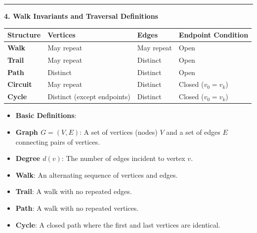 \documentclass[
]{book}
\newcounter{none} %
\providecommand{\tightlist}{%
  \setlength{\itemsep}{0pt}\setlength{\parskip}{0pt}}
\theoremstyle{definition}
\theoremstyle{definition}
\theoremstyle{definition}
\theoremstyle{definition}
\theoremstyle{remark}
\begin{document}
\begin{center}\rule{0.5\linewidth}{0.5pt}\end{center}

\textbf{4. Walk Invariants and Traversal Definitions}

{\def\LTcaptype{none} %
\begin{longtable}[]{@{}
  >{\raggedright\arraybackslash}p{}
  >{\raggedright\arraybackslash}p{}
  >{\raggedright\arraybackslash}p{}
  >{\raggedright\arraybackslash}p{}@{}}
\toprule\noalign{}
\begin{minipage}[b]{\linewidth}\raggedright
Structure
\end{minipage} & \begin{minipage}[b]{\linewidth}\raggedright
Vertices
\end{minipage} & \begin{minipage}[b]{\linewidth}\raggedright
Edges
\end{minipage} & \begin{minipage}[b]{\linewidth}\raggedright
Endpoint Condition
\end{minipage} \\
\midrule\noalign{}
\endhead
\bottomrule\noalign{}
\endlastfoot
\textbf{Walk} & May repeat & May repeat & Open \\
\textbf{Trail} & May repeat & Distinct & Open \\
\textbf{Path} & Distinct & Distinct & Open \\
\textbf{Circuit} & May repeat & Distinct & Closed (\(v_0 = v_k\)) \\
\textbf{Cycle} & Distinct (except endpoints) & Distinct & Closed (\(v_0 = v_k\)) \\
\end{longtable}
}

\begin{itemize}
\tightlist
\item
  \textbf{Basic Definitions}:
\item
  \textbf{Graph \(G = (V, E)\)}: A set of vertices (nodes) \(V\) and a set of edges \(E\) connecting pairs of vertices.
\item
  \textbf{Degree \(d(v)\)}: The number of edges incident to vertex \(v\).
\item
  \textbf{Walk}: An alternating sequence of vertices and edges.
\item
  \textbf{Trail}: A walk with no repeated edges.
\item
  \textbf{Path}: A walk with no repeated vertices.
\item
  \textbf{Cycle}: A closed path where the first and last vertices are identical.
\end{itemize}
\end{document}
